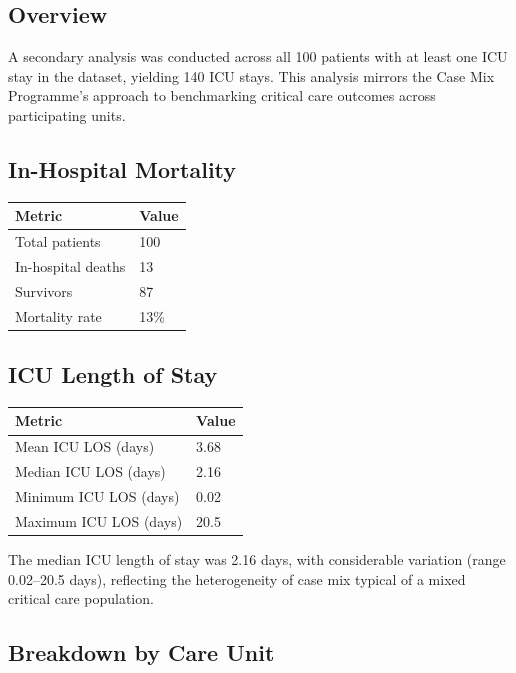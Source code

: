 \documentclass[
]{article}
\newcounter{none} %
\begin{document}
\subsection{Overview}\label{overview-1}

A secondary analysis was conducted across all 100 patients with at least
one ICU stay in the dataset, yielding 140 ICU stays. This analysis
mirrors the Case Mix Programme's approach to benchmarking critical care
outcomes across participating units.

\subsection{In-Hospital Mortality}\label{in-hospital-mortality}

{\def\LTcaptype{none} %
\begin{longtable}[]{@{}ll@{}}
\toprule\noalign{}
Metric & Value \\
\midrule\noalign{}
\endhead
\bottomrule\noalign{}
\endlastfoot
Total patients & 100 \\
In-hospital deaths & 13 \\
Survivors & 87 \\
Mortality rate & 13\% \\
\end{longtable}
}

\subsection{ICU Length of Stay}\label{icu-length-of-stay}

{\def\LTcaptype{none} %
\begin{longtable}[]{@{}ll@{}}
\toprule\noalign{}
Metric & Value \\
\midrule\noalign{}
\endhead
\bottomrule\noalign{}
\endlastfoot
Mean ICU LOS (days) & 3.68 \\
Median ICU LOS (days) & 2.16 \\
Minimum ICU LOS (days) & 0.02 \\
Maximum ICU LOS (days) & 20.5 \\
\end{longtable}
}

The median ICU length of stay was 2.16 days, with considerable variation
(range 0.02--20.5 days), reflecting the heterogeneity of case mix
typical of a mixed critical care population.

\subsection{Breakdown by Care Unit}\label{breakdown-by-care-unit}
\end{document}
